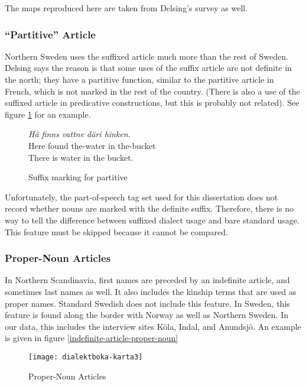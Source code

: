 The maps reproduced here are taken from Delsing's survey as well.

\subsubsection{``Partitive'' Article}

Northern Sweden uses the suffixed article much more than the rest of
Sweden. Delsing says the reason is that some uses of the suffix
article are not definite in the north; they have a partitive function,
similar to the partitive article in French, which is not marked in the
rest of the country. (There is also a use of the suffixed article in
predicative constructions, but this is probably not related). See
figure \ref{partitive-article} for an example.


\begin{figure}
  {\it H\"a finns vattne d\"ari hinken.} \\
  Here found the-water in the-bucket \\
  There is water in the bucket. \\
  \caption{Suffix marking for partitive}
  \label{partitive-article}
\end{figure}

Unfortunately, the part-of-speech tag set used for this
dissertation does not record whether nouns are marked with the
definite suffix. Therefore, there is no way to tell the difference
between suffixed dialect usage and bare standard usage. This feature
must be skipped because it cannot be compared.

\subsubsection{Proper-Noun Articles}

In Northern Scandinavia, first names are preceded by an indefinite
article, and sometimes last names as well. It also includes the
kinship terms that are used as proper names. Standard Swedish does not
include this feature. In Sweden, this feature is found along the border
with Norway as well as Northern Sweden. In our data, this includes the
interview sites K\"ola, Indal, and Anundsj\"o. An example is given in
figure \ref{indefinite-article-proper-noun}

\begin{figure}
  \texttt{[image: dialektboka-karta3]}
  \caption{Proper-Noun Articles}
  \label{indefinite-article-proper-noun-map}
\end{figure}

